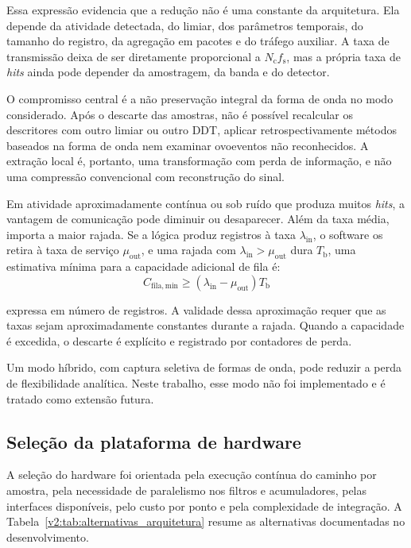 Essa expressão evidencia que a redução não é uma constante da arquitetura. Ela depende da atividade detectada, do limiar, dos parâmetros temporais, do tamanho do registro, da agregação em pacotes e do tráfego auxiliar. A taxa de transmissão deixa de ser diretamente proporcional a \(N_{\mathrm{c}}f_{\mathrm{s}}\), mas a própria taxa de \textit{hits} ainda pode depender da amostragem, da banda e do detector.

O compromisso central é a não preservação integral da forma de onda no modo considerado. Após o descarte das amostras, não é possível recalcular os descritores com outro limiar ou outro DDT, aplicar retrospectivamente métodos baseados na forma de onda nem examinar 
ovo{eventos} não reconhecidos. A extração local é, portanto, uma transformação com perda de informação, e não uma compressão convencional com reconstrução do sinal.

Em atividade aproximadamente contínua ou sob ruído que produza muitos \textit{hits}, a vantagem de comunicação pode diminuir ou desaparecer. Além da taxa média, importa a maior rajada. Se a lógica produz registros à taxa \(\lambda_{\mathrm{in}}\), o software os retira à taxa de serviço \(\mu_{\mathrm{out}}\), e uma rajada com \(\lambda_{\mathrm{in}}>\mu_{\mathrm{out}}\) dura \(T_{\mathrm{b}}\), uma estimativa mínima para a capacidade adicional de fila é:
\begin{equation}
	C_{\mathrm{fila,min}} \geq \left(\lambda_{\mathrm{in}} - \mu_{\mathrm{out}}\right) T_{\mathrm{b}}
	\label{v2:eq:capacidade_fila_rajada}
\end{equation}

\noindent
expressa em número de registros. A validade dessa aproximação requer que as taxas sejam aproximadamente constantes durante a rajada. Quando a capacidade é excedida, o descarte é explícito e registrado por contadores de perda.

Um modo híbrido, com captura seletiva de formas de onda, pode reduzir a perda de flexibilidade analítica. Neste trabalho, esse modo não foi implementado e é tratado como extensão futura.

\subsection{Seleção da plataforma de hardware}
\label{v2:subsec:plataforma_hardware}

A seleção do hardware foi orientada pela execução contínua do caminho por amostra, pela necessidade de paralelismo nos filtros e acumuladores, pelas interfaces disponíveis, pelo custo por ponto e pela complexidade de integração. A Tabela~\ref{v2:tab:alternativas_arquitetura} resume as alternativas documentadas no desenvolvimento.

